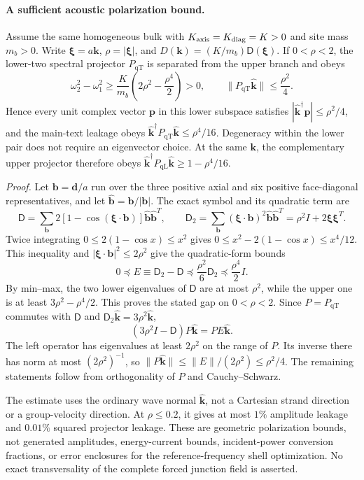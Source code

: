 \documentclass[10pt,aps,onecolumn,notitlepage,nofootinbib]{revtex4-2}
\newcommand{\vk}{\bm k}
\newcommand{\qT}{\mathrm{qT}}
\newcommand{\qL}{\mathrm{qL}}
\begin{document}
\paragraph*{A sufficient acoustic polarization bound.}
Assume the same homogeneous bulk with $K_{\rm axis}=K_{\rm diag}=K>0$
and site mass $m_b>0$.  Write $\bm\xi=a\vk$, $\rho=|\bm\xi|$, and
$D(\vk)=(K/m_b)\mathsf D(\bm\xi)$.  If $0<\rho<2$, the lower-two
spectral projector $P_{\qT}$ is separated from the upper branch and obeys
\[
 \omega_2^2-\omega_1^2
 \geq\frac{K}{m_b}\left(2\rho^2-\frac{\rho^4}{2}\right)>0,
 \qquad
 \|P_{\qT}\hat{\vk}\|\leq\frac{\rho^2}{4}.
\]
Hence every unit complex vector $\bm p$ in this lower subspace satisfies
$|\hat{\vk}^{\dagger}\bm p|\leq\rho^2/4$, and the main-text leakage
obeys $\hat{\vk}^{\dagger}P_{\qT}\hat{\vk}\leq\rho^4/16$.
Degeneracy within the lower pair does not require an eigenvector choice.  At the same $\vk$, the complementary upper projector therefore obeys
$\hat{\vk}^{\dagger}P_{\qL}\hat{\vk}\geq1-\rho^4/16$.

\emph{Proof.}  Let $\bm b=\bm d/a$ run over the three positive axial and
six positive face-diagonal representatives, and let
$\hat{\bm b}=\bm b/|\bm b|$.  The exact symbol and its quadratic term are
\[
 \mathsf D=\sum_{\bm b}2[1-\cos(\bm\xi\cdot\bm b)]
       \hat{\bm b}\hat{\bm b}^{T},
 \qquad
 \mathsf D_2=\sum_{\bm b}(\bm\xi\cdot\bm b)^2
       \hat{\bm b}\hat{\bm b}^{T}
       =\rho^2I+2\bm\xi\bm\xi^T.
\]
Twice integrating $0\leq2(1-\cos x)\leq x^2$ gives
$0\leq x^2-2(1-\cos x)\leq x^4/12$.  This inequality and
$|\bm\xi\cdot\bm b|^2\leq2\rho^2$ give the quadratic-form bounds
\[
 0\preceq E\equiv\mathsf D_2-\mathsf D
 \preceq\frac{\rho^2}{6}\mathsf D_2
 \preceq\frac{\rho^4}{2}I.
\]
By min--max, the two lower eigenvalues of $\mathsf D$ are at most
$\rho^2$, while the upper one is at least $3\rho^2-\rho^4/2$.
This proves the stated gap on $0<\rho<2$.  Since $P=P_{\qT}$ commutes
with $\mathsf D$ and $\mathsf D_2\hat{\vk}=3\rho^2\hat{\vk}$,
\[
 (3\rho^2I-\mathsf D)P\hat{\vk}=PE\hat{\vk}.
\]
The left operator has eigenvalues at least $2\rho^2$ on the range of
$P$.  Its inverse there has norm at most $(2\rho^2)^{-1}$, so
$\|P\hat{\vk}\|\leq\|E\|/(2\rho^2)\leq\rho^2/4$.
The remaining statements follow from orthogonality of $P$ and
Cauchy--Schwarz.

The estimate uses the ordinary wave normal $\hat{\vk}$, not a Cartesian
strand direction or a group-velocity direction.  At $\rho\leq0.2$, it gives
at most $1\%$ amplitude leakage and $0.01\%$ squared projector leakage.
These are geometric polarization bounds, not generated amplitudes,
energy-current bounds, incident-power conversion fractions, or error
enclosures for the reference-frequency shell optimization.  No exact
transversality of the complete forced junction field is asserted.
\end{document}

